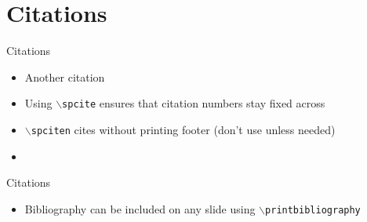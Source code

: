 \section{Citations}


\begin{frame}[c]{Citations}
    \begin{itemize}
        \item Another citation 
        \item Using \texttt{$\backslash$spcite} ensures that citation numbers stay fixed across  
        \item \texttt{$\backslash$spciten} cites without printing footer (don't use unless needed) 
        \item {}
    \end{itemize}
\end{frame}    
    
\begin{frame}{Citations}
\begin{itemize}
        \item Bibliography can be included on any slide using \texttt{$\backslash$printbibliography}
\end{itemize}
    \printbibliography%
\end{frame}
